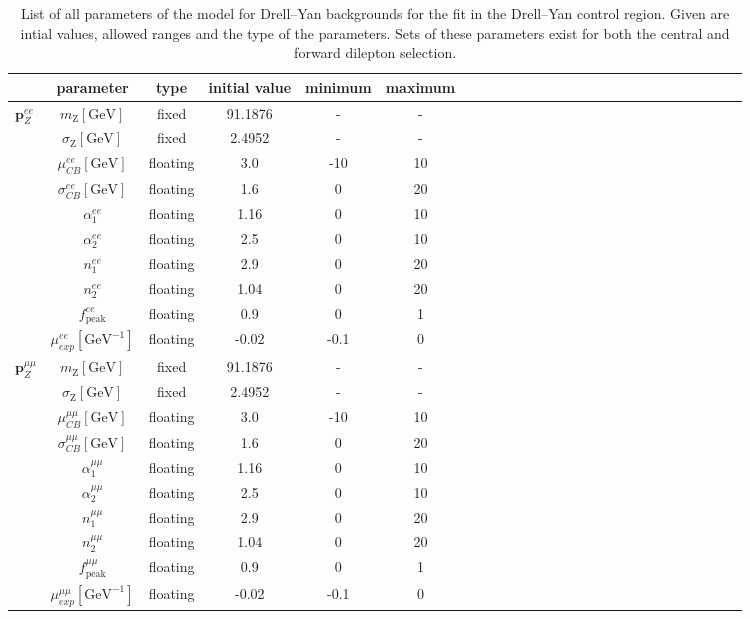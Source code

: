 \begin{table}[htbp]
\begin{center}
 \renewcommand{\arraystretch}{1.3}
 \caption{List of all parameters of the model for Drell--Yan backgrounds for the fit in the Drell--Yan control region. Given are intial values, allowed ranges and the type of the parameters. Sets of these parameters exist for both the central and forward dilepton selection.\label{tab:Fit_Par_Overview_Z}}
\begin{tabular}{l|c|c|c|c|ccccccccccccccccccccc}
& parameter & type & initial value & minimum & maximum \\ \hline
\multirow{10}{*}{$\mathbf{p}_{Z}^{ee}$} & $m_{\mathrm{Z}} [\mathrm{GeV}]$ & fixed & 91.1876 & - & - \\ 
& $\sigma_{\mathrm{Z}}  [\mathrm{GeV}]$ & fixed & 2.4952 & - & - \\
& $\mu_{CB}^{ee} [\mathrm{GeV}]$ & floating & 3.0 & -10 & 10 \\ 
& $\sigma_{CB}^{ee} [\mathrm{GeV}]$ & floating & 1.6 & 0 & 20 \\
& $\alpha_{1}^{ee}$ & floating & 1.16 & 0 & 10 \\
& $\alpha_{2}^{ee}$ & floating & 2.5 & 0 & 10 \\
& $n_{1}^{ee}$ & floating & 2.9 & 0 & 20 \\
& $n_{2}^{ee}$ & floating & 1.04 & 0 & 20 \\
& $f_\text{peak}^{ee}$ & floating & 0.9 & 0 & 1 \\
& $\mu_{exp}^{ee} [\mathrm{GeV}^{-1}]$ & floating & -0.02& -0.1 & 0 \\ \hline
\multirow{10}{*}{$\mathbf{p}_{Z}^{\mu\mu}$} & $m_{\mathrm{Z}} [\mathrm{GeV}]$ & fixed & 91.1876 & - & - \\ 
& $\sigma_{\mathrm{Z}} [\mathrm{GeV}]$  & fixed & 2.4952 & - & - \\
& $\mu_{CB}^{\mu\mu} [\mathrm{GeV}]$ & floating & 3.0 & -10 & 10 \\
&  $\sigma_{CB}^{\mu\mu} [\mathrm{GeV}]$ & floating & 1.6 & 0 & 20 \\
&  $\alpha_{1}^{\mu\mu}$ & floating & 1.16 & 0 & 10 \\
&  $\alpha_{2}^{\mu\mu}$ & floating & 2.5 & 0 & 10 \\
&  $n_{1}^{\mu\mu}$ & floating & 2.9 & 0 & 20 \\
&  $n_{2}^{\mu\mu}$ & floating & 1.04 & 0 & 20 \\
&  $f_\text{peak}^{\mu\mu}$ & floating & 0.9 & 0 & 1 \\
&  $\mu_{exp}^{\mu\mu} [\mathrm{GeV}^{-1}]$& floating & -0.02 & -0.1 & 0 \\ 
\end{tabular}

\end{center}
\end{table}


